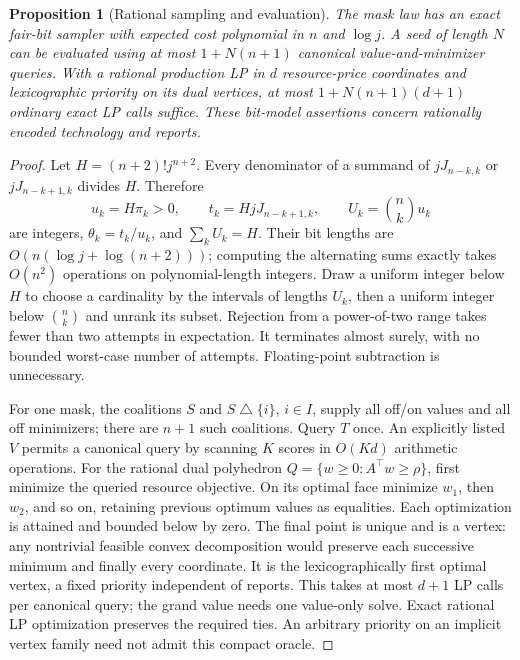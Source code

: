\documentclass[11pt]{article}
\newtheorem{proposition}[theorem]{Proposition}
\theoremstyle{definition}\newtheorem{definition}[theorem]{Definition}
\theoremstyle{remark}\newtheorem{remark}[theorem]{Remark}
\begin{document}
\begin{proposition}[Rational sampling and evaluation]\label{alg:cost}
The mask law has an exact fair-bit sampler with expected cost polynomial in
$n$ and $\log j$.  A seed of length $N$ can be evaluated using at most
$1+N(n+1)$ canonical value-and-minimizer queries.  With a rational production
LP in $d$ resource-price coordinates and lexicographic priority on its dual
vertices, at most $1+N(n+1)(d+1)$ ordinary exact LP calls suffice.
These bit-model assertions concern rationally encoded technology and reports.
\end{proposition}
\begin{proof}
Let $H=(n+2)!j^{n+2}$.  Every denominator of a summand of
$jJ_{n-k,k}$ or $jJ_{n-k+1,k}$ divides $H$.  Therefore
\[
 u_k=H\pi_k>0,\qquad t_k=HjJ_{n-k+1,k},\qquad
 U_k=\binom nk u_k
\]
are integers, $\theta_k=t_k/u_k$, and $\sum_kU_k=H$.
Their bit lengths are $O(n(\log j+\log(n+2)))$; computing the alternating
sums exactly takes $O(n^2)$ operations on polynomial-length integers.
Draw a uniform integer below $H$ to choose a cardinality by the intervals
of lengths $U_k$, then a uniform integer below $\binom nk$ and unrank its
subset.  Rejection from a power-of-two range takes fewer than two attempts
in expectation.  It terminates almost surely, with no bounded worst-case
number of attempts.  Floating-point subtraction is unnecessary.

For one mask, the coalitions $S$ and $S\mathbin{\triangle}\{i\}$,
$i\in I$, supply all off/on values and all off minimizers; there are $n+1$
such coalitions.  Query $T$ once.  An explicitly listed $V$ permits a canonical
query by scanning $K$ scores in $O(Kd)$ arithmetic operations.
For the rational dual polyhedron $Q=\{w\ge0:A^\top w\ge\rho\}$,
first minimize the queried resource objective.  On its optimal face minimize
$w_1$, then $w_2$, and so on, retaining previous optimum values as equalities.
Each optimization is attained and bounded below by zero.  The final point
is unique and is a vertex: any nontrivial feasible convex decomposition
would preserve each successive minimum and finally every coordinate.
It is the lexicographically first optimal vertex, a fixed priority independent
of reports.  This takes at most $d+1$ LP calls per canonical query; the grand
value needs one value-only solve.  Exact rational LP optimization preserves
the required ties.  An arbitrary priority on an implicit vertex family need
not admit this compact oracle.
\end{proof}
\end{document}
